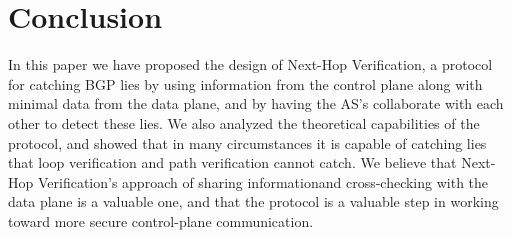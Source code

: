 \documentclass[10pt]{article}
\begin{document}
\section{Conclusion}
In this paper we have proposed the design of Next-Hop Verification, a protocol for catching BGP lies by using information from the control plane along with minimal data from the data plane, and by having the AS's collaborate with each other to detect these lies. We also analyzed the theoretical capabilities of the protocol, and showed that in many circumstances it is capable of catching lies that loop verification and path verification cannot catch. We believe that Next-Hop Verification's approach of sharing informationand cross-checking with the data plane is a valuable one, and that the protocol is a valuable step in working toward more secure control-plane communication.


{}


\clearpage
\end{document}

